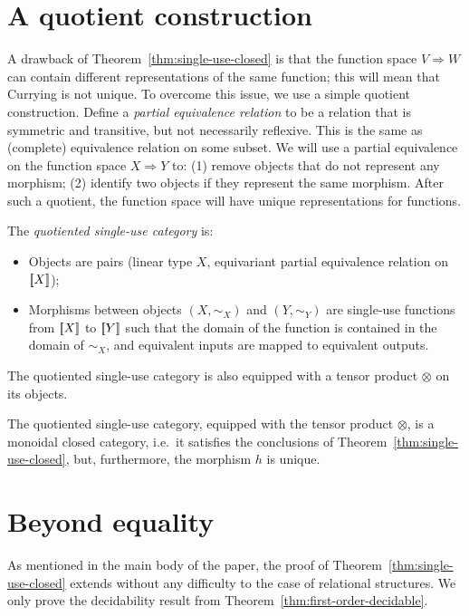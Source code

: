 \documentclass[10pt,a4paper]{amsart}
\numberwithin{equation}{section}
\theoremstyle{plain}
\newcommand{\sem}[1]{[{\kern-0.45ex}[#1]{\kern-0.45ex}]}
\newcommand{\funspace}[2]{#1 \Rightarrow #2}
\begin{document}
\section{A quotient construction}
\label{sec:quotient-category}
A drawback of Theorem~\ref{thm:single-use-closed} is that the function space $\funspace V W$ can contain different representations of the same function; this will mean that Currying is not unique. To overcome this issue, we use a simple quotient construction. 
Define a \emph{partial equivalence relation} to be a relation that is symmetric and transitive, but not necessarily reflexive.  This is the same as (complete) equivalence relation on some subset. We will use a partial equivalence on the function space $X \Rightarrow Y$ to: (1)
 remove objects that do not represent any morphism; (2) identify two objects if they represent the same morphism. After such a quotient, the function space will have unique representations for functions. 




\begin{definition}
    The \emph{quotiented single-use category} is: 
    \begin{itemize}
    \item Objects are pairs (linear type $X$, equivariant partial equivalence relation on $\sem X$);
    \item Morphisms between objects $(X,\sim_X)$ and $(Y,\sim_Y)$ are single-use functions from $\sem X$ to $\sem Y$ such that the domain of the function is contained in the domain of $\sim_X$, and equivalent inputs are mapped to equivalent outputs.
    \end{itemize}
\end{definition}

The quotiented single-use category is also equipped with a tensor product $\otimes$ on its objects.
\begin{theorem}
    The quotiented single-use category, equipped with the tensor product $\otimes$, is a monoidal closed category, i.e.~it satisfies the conclusions of Theorem~\ref{thm:single-use-closed}, but, furthermore, the morphism $h$ is unique.
\end{theorem}

\section{Beyond equality}
\label{sec:beyond-equality-appendix}

As mentioned in the main body of the paper, the proof of Theorem~\ref{thm:single-use-closed} extends without any difficulty to the case of relational structures. We only prove the decidability result from Theorem~\ref{thm:first-order-decidable}.
\end{document}
